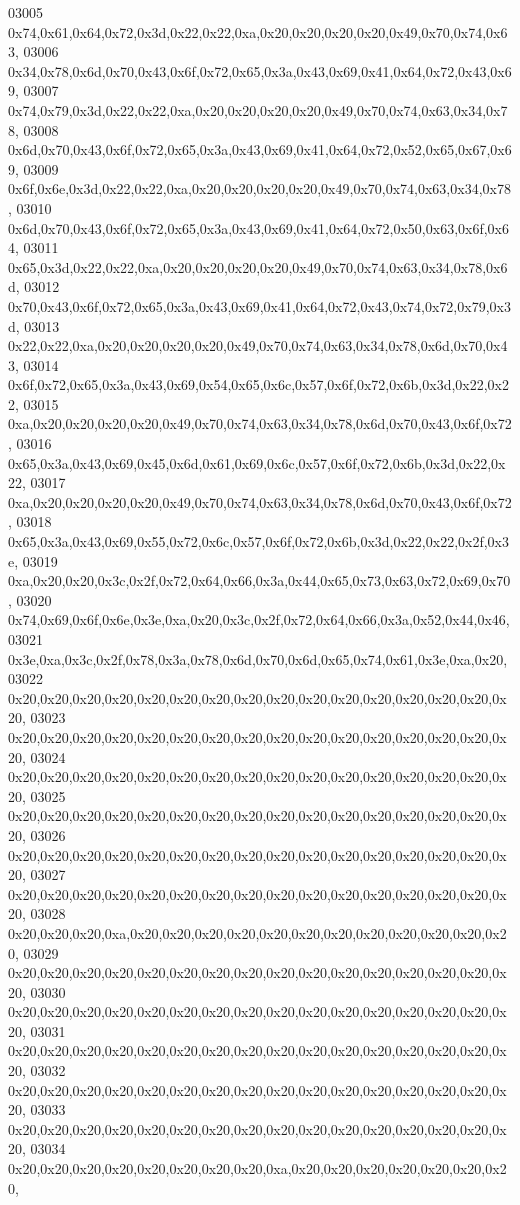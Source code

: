 \begin{DoxyCode}
03005   0x74,0x61,0x64,0x72,0x3d,0x22,0x22,0xa,0x20,0x20,0x20,0x20,0x49,0x70,0x74,0x63,
03006   0x34,0x78,0x6d,0x70,0x43,0x6f,0x72,0x65,0x3a,0x43,0x69,0x41,0x64,0x72,0x43,0x69,
03007   0x74,0x79,0x3d,0x22,0x22,0xa,0x20,0x20,0x20,0x20,0x49,0x70,0x74,0x63,0x34,0x78,
03008   0x6d,0x70,0x43,0x6f,0x72,0x65,0x3a,0x43,0x69,0x41,0x64,0x72,0x52,0x65,0x67,0x69,
03009   0x6f,0x6e,0x3d,0x22,0x22,0xa,0x20,0x20,0x20,0x20,0x49,0x70,0x74,0x63,0x34,0x78,
03010   0x6d,0x70,0x43,0x6f,0x72,0x65,0x3a,0x43,0x69,0x41,0x64,0x72,0x50,0x63,0x6f,0x64,
03011   0x65,0x3d,0x22,0x22,0xa,0x20,0x20,0x20,0x20,0x49,0x70,0x74,0x63,0x34,0x78,0x6d,
03012   0x70,0x43,0x6f,0x72,0x65,0x3a,0x43,0x69,0x41,0x64,0x72,0x43,0x74,0x72,0x79,0x3d,
03013   0x22,0x22,0xa,0x20,0x20,0x20,0x20,0x49,0x70,0x74,0x63,0x34,0x78,0x6d,0x70,0x43,
03014   0x6f,0x72,0x65,0x3a,0x43,0x69,0x54,0x65,0x6c,0x57,0x6f,0x72,0x6b,0x3d,0x22,0x22,
03015   0xa,0x20,0x20,0x20,0x20,0x49,0x70,0x74,0x63,0x34,0x78,0x6d,0x70,0x43,0x6f,0x72,
03016   0x65,0x3a,0x43,0x69,0x45,0x6d,0x61,0x69,0x6c,0x57,0x6f,0x72,0x6b,0x3d,0x22,0x22,
03017   0xa,0x20,0x20,0x20,0x20,0x49,0x70,0x74,0x63,0x34,0x78,0x6d,0x70,0x43,0x6f,0x72,
03018   0x65,0x3a,0x43,0x69,0x55,0x72,0x6c,0x57,0x6f,0x72,0x6b,0x3d,0x22,0x22,0x2f,0x3e,
03019   0xa,0x20,0x20,0x3c,0x2f,0x72,0x64,0x66,0x3a,0x44,0x65,0x73,0x63,0x72,0x69,0x70,
03020   0x74,0x69,0x6f,0x6e,0x3e,0xa,0x20,0x3c,0x2f,0x72,0x64,0x66,0x3a,0x52,0x44,0x46,
03021   0x3e,0xa,0x3c,0x2f,0x78,0x3a,0x78,0x6d,0x70,0x6d,0x65,0x74,0x61,0x3e,0xa,0x20,
03022   0x20,0x20,0x20,0x20,0x20,0x20,0x20,0x20,0x20,0x20,0x20,0x20,0x20,0x20,0x20,0x20,
03023   0x20,0x20,0x20,0x20,0x20,0x20,0x20,0x20,0x20,0x20,0x20,0x20,0x20,0x20,0x20,0x20,
03024   0x20,0x20,0x20,0x20,0x20,0x20,0x20,0x20,0x20,0x20,0x20,0x20,0x20,0x20,0x20,0x20,
03025   0x20,0x20,0x20,0x20,0x20,0x20,0x20,0x20,0x20,0x20,0x20,0x20,0x20,0x20,0x20,0x20,
03026   0x20,0x20,0x20,0x20,0x20,0x20,0x20,0x20,0x20,0x20,0x20,0x20,0x20,0x20,0x20,0x20,
03027   0x20,0x20,0x20,0x20,0x20,0x20,0x20,0x20,0x20,0x20,0x20,0x20,0x20,0x20,0x20,0x20,
03028   0x20,0x20,0x20,0xa,0x20,0x20,0x20,0x20,0x20,0x20,0x20,0x20,0x20,0x20,0x20,0x20,
03029   0x20,0x20,0x20,0x20,0x20,0x20,0x20,0x20,0x20,0x20,0x20,0x20,0x20,0x20,0x20,0x20,
03030   0x20,0x20,0x20,0x20,0x20,0x20,0x20,0x20,0x20,0x20,0x20,0x20,0x20,0x20,0x20,0x20,
03031   0x20,0x20,0x20,0x20,0x20,0x20,0x20,0x20,0x20,0x20,0x20,0x20,0x20,0x20,0x20,0x20,
03032   0x20,0x20,0x20,0x20,0x20,0x20,0x20,0x20,0x20,0x20,0x20,0x20,0x20,0x20,0x20,0x20,
03033   0x20,0x20,0x20,0x20,0x20,0x20,0x20,0x20,0x20,0x20,0x20,0x20,0x20,0x20,0x20,0x20,
03034   0x20,0x20,0x20,0x20,0x20,0x20,0x20,0x20,0xa,0x20,0x20,0x20,0x20,0x20,0x20,0x20,

\end{DoxyCode}
